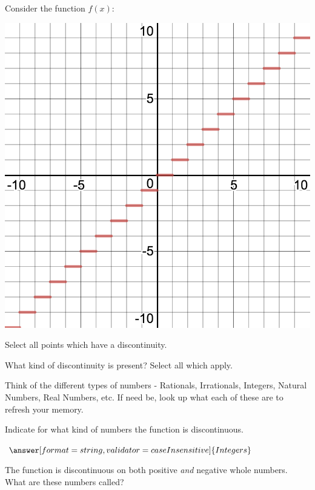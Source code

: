 \documentclass{ximera}
\begin{document}
\begin{question}
Consider the function $f(x)$:
\begin{image}
\includegraphics{continuity6}
\end{image}
Select all points which have a discontinuity.

\begin{selectAll}
\end{selectAll}

What kind of discontinuity is present? Select all which apply.

\begin{selectAll}
\end{selectAll}

\begin{hint}
Think of the different types of numbers - Rationals, Irrationals, Integers, Natural Numbers, Real Numbers, etc. If need be, look up what each of these are to refresh your memory.
\end{hint}
Indicate for what kind of numbers the function is discontinuous.

$\answer[format=string,validator=caseInsensitive]{Integers}$
\begin{feedback}
The function is discontinuous on both positive \textit{and} negative whole numbers. What are these numbers called?
\end{feedback}
\end{question}
\end{document}
